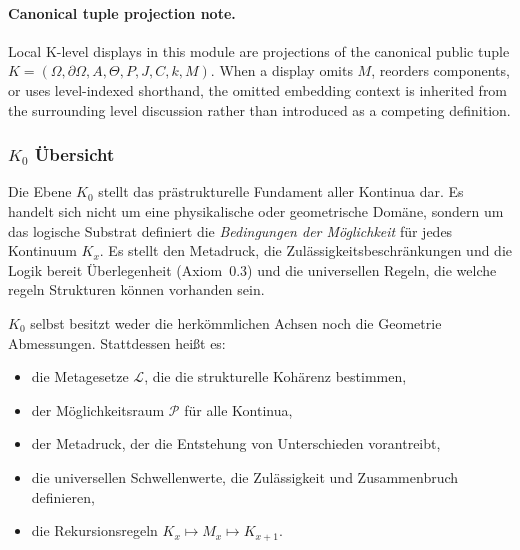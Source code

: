 



\paragraph{Canonical tuple projection note.}
Local K-level displays in this module are projections of the canonical public tuple \(K=(\Omega,\partial\Omega,A,\Theta,P,J,C,k,M)\). When a display omits \(M\), reorders components, or uses level-indexed shorthand, the omitted embedding context is inherited from the surrounding level discussion rather than introduced as a competing definition.

\subsubsection{\texorpdfstring{$K_0$}{K_0} Übersicht}
\label{sec:k0-overview}

Die Ebene $K_0$ stellt das prästrukturelle Fundament aller Kontinua dar.
Es handelt sich nicht um eine physikalische oder geometrische Domäne, sondern um das logische Substrat
definiert die \emph{Bedingungen der Möglichkeit} für jedes Kontinuum $K_x$.
Es stellt den Metadruck, die Zulässigkeitsbeschränkungen und die Logik bereit
Überlegenheit (Axiom~0.3) und die universellen Regeln, die welche regeln
Strukturen können vorhanden sein.

$K_0$ selbst besitzt weder die herkömmlichen Achsen noch die Geometrie
Abmessungen.
Stattdessen heißt es:
\begin{itemize}
    \item die Metagesetze $\mathcal{L}$, die die strukturelle Kohärenz bestimmen,
    \item der Möglichkeitsraum $\mathcal{P}$ für alle Kontinua,
    \item der Metadruck, der die Entstehung von Unterschieden vorantreibt,
    \item die universellen Schwellenwerte, die Zulässigkeit und Zusammenbruch definieren,
    \item die Rekursionsregeln $K_x \mapsto M_x \mapsto K_{x+1}$.
\end{itemize}

